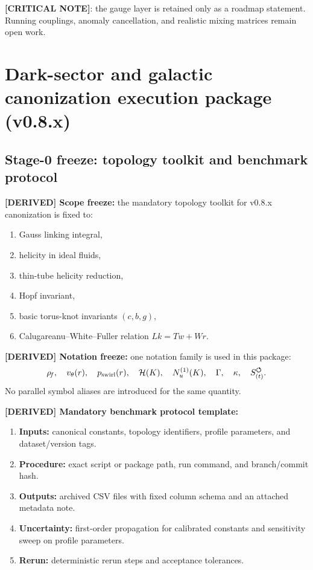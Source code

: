\textbf{[CRITICAL NOTE]}: the gauge layer is retained only as a roadmap statement. Running couplings, anomaly cancellation, and realistic mixing matrices remain open work.

\section{Dark-sector and galactic canonization execution package (v0.8.x)}
\label{sec:dark-sector-execution-package}

\subsection{Stage-0 freeze: topology toolkit and benchmark protocol}
\textbf{[DERIVED] Scope freeze:} the mandatory topology toolkit for v0.8.x canonization is fixed to:
\begin{enumerate}
    \item Gauss linking integral,
    \item helicity in ideal fluids,
    \item thin-tube helicity reduction,
    \item Hopf invariant,
    \item basic torus-knot invariants $(c,b,g)$,
    \item Calugareanu--White--Fuller relation $Lk=Tw+Wr$.
\end{enumerate}

\textbf{[DERIVED] Notation freeze:} one notation family is used in this package:
\[
\rho_{\!f},\quad v_\theta(r),\quad p_{\mathrm{swirl}}(r),\quad
\mathcal{H}(K),\quad N_u^{(1)}(K),\quad \Gamma,\quad \kappa,\quad S_{(t)}^{\boldsymbol{\circlearrowleft}}.
\]
No parallel symbol aliases are introduced for the same quantity.

\textbf{[DERIVED] Mandatory benchmark protocol template:}
\begin{enumerate}
    \item \textbf{Inputs:} canonical constants, topology identifiers, profile parameters, and dataset/version tags.
    \item \textbf{Procedure:} exact script or package path, run command, and branch/commit hash.
    \item \textbf{Outputs:} archived CSV files with fixed column schema and an attached metadata note.
    \item \textbf{Uncertainty:} first-order propagation for calibrated constants and sensitivity sweep on profile parameters.
    \item \textbf{Rerun:} deterministic rerun steps and acceptance tolerances.
\end{enumerate}

